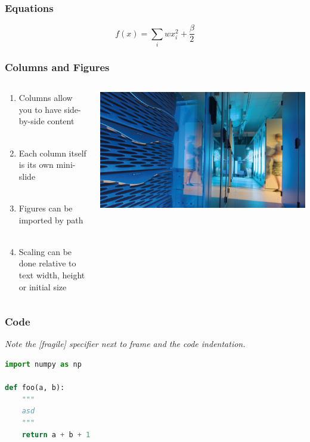 \documentclass[aspectratio=1610]{beamer}
\begin{document}
\begin{frame}
\frametitle{Equations}

    \begin{equation*}
        f(x) = \sum_i wx_i^2 + \frac{\beta}{2}
    \end{equation*}
\end{frame}


\begin{frame}
    \frametitle{Columns and Figures}

    \begin{columns}
        \begin{column}{0.4\textwidth}
            \begin{enumerate}
                \item Columns allow you to have side-by-side content\\~
                \item Each column itself is its own mini-slide\\~
                \item Figures can be imported by path\\~
                \item Scaling can be done relative to text width, height or initial size
            \end{enumerate}
        \end{column}
        \begin{column}{0.4\textwidth}
            \centering
            \includegraphics[width=\textwidth]{logos/hgf_key_technologies.jpg}
        \end{column}
    \end{columns}
\end{frame}

\begin{frame}[fragile]
    \frametitle{Code}
    
    \emph{Note the [fragile] specifier next to frame and the code indentation.}
    
\begin{lstlisting}[language=Python]
import numpy as np

def foo(a, b):
    """
    asd
    """
    return a + b + 1
\end{lstlisting}
\end{frame}
\end{document}
